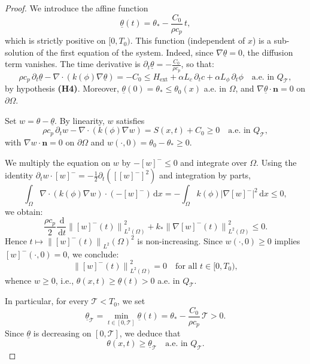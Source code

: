 \documentclass[final,1p,times]{elsarticle}
\newcommand{\dx}{\,\mathrm{d}x}
\numberwithin{equation}{section}
\newcommand{\QT}{Q_{\mathcal{T}}}
\newcommand{\dd}{\,\mathrm{d}}
\newcommand{\dt}{\,\mathrm{d}t}
\newcommand{\norm}[1]{\left\|#1\right\|}
\newcommand{\pneg}[1]{\left[#1\right]^{-}}
\newcommand{\ptn}{\partial_t}
\begin{document}
	\begin{proof}
		We introduce the affine function
		\[
		\underline{\theta}(t) = \theta_* - \frac{C_0}{\rho c_p}\,t,
		\]
		which is strictly positive on $[0,T_0)$. This function (independent of $x$) is a sub-solution of the first equation of the system. Indeed, since $\nabla\underline{\theta} = 0$, the diffusion term vanishes. The time derivative is $\ptn\underline{\theta} = -\frac{C_0}{\rho c_p}$, so that:
		\[
		\rho c_p\,\ptn\underline{\theta} - \nabla\cdot(k(\phi)\nabla\underline{\theta})
		= -C_0 \leq H_{\mathrm{ext}} + \alpha L_c\,\ptn c + \alpha L_\phi\,\ptn\phi
		\quad\text{a.e. in } \QT,
		\]
		by hypothesis \textbf{(H4)}. Moreover, $\underline{\theta}(0) = \theta_* \leq \theta_0(x)$
		a.e. in $\Omega$, and $\nabla\underline{\theta}\cdot\mathbf{n} = 0$ on $\partial\Omega$.
		
		Set $w = \theta - \underline{\theta}$. By linearity, $w$ satisfies
		\[
		\rho c_p\,\ptn w - \nabla\cdot(k(\phi)\nabla w)
		= S(x,t) + C_0 \geq 0 \quad\text{a.e. in } \QT,
		\]
		with $\nabla w\cdot\mathbf{n} = 0$ on $\partial\Omega$ and $w(\cdot,0) = \theta_0 - \theta_* \geq 0$.
		
		We multiply the equation on $w$ by $-\pneg{w} \leq 0$ and integrate over $\Omega$. Using
		the identity $\ptn w \cdot \pneg{w} = -\frac12 \ptn ([\pneg{w}]^2)$ and integration by parts,
		\[
		\int_\Omega \nabla\cdot(k(\phi)\nabla w)\cdot(-\pneg{w})\dx
		= -\int_\Omega k(\phi)|\nabla\pneg{w}|^2\dx
		\leq 0,
		\]
		we obtain:
		\[
		\frac{\rho c_p}{2}\frac{\dd}{\dt}\norm{\pneg{w}(t)}_{L^2(\Omega)}^2
		+ k_*\norm{\nabla\pneg{w}(t)}_{L^2(\Omega)}^2 \leq 0.
		\]
		Hence $t \mapsto \norm{\pneg{w}(t)}_{L^2}(\Omega)^2$ is non-increasing. Since
		$w(\cdot,0) \geq 0$ implies $\pneg{w}(\cdot,0) = 0$, we conclude:
		\[
		\norm{\pneg{w}(t)}_{L^2(\Omega)}^2 = 0 \quad\text{for all } t \in [0,T_0),
		\]
		whence $w \geq 0$, i.e., $\theta(x,t) \geq \underline{\theta}(t) > 0$ a.e. in $\QT$.
		
		In particular, for every $\mathcal T<T_0$, we set
		\begin{equation}
			\label{eq3.1}
			\underline{\theta}_{\mathcal T} =\min_{t\in[0,\mathcal T]}\underline{\theta}(t)
			=\theta_*-\frac{C_0}{\rho c_p}\,\mathcal T>0.
		\end{equation}
		Since $\underline{\theta}$ is decreasing on $[0,\mathcal T]$, we deduce that
		\[
		\theta(x,t)\ge \underline{\theta}_{\mathcal T}\quad \text{a.e. in }Q_{\mathcal T}.
		\]
	\end{proof}
	
\end{document}
